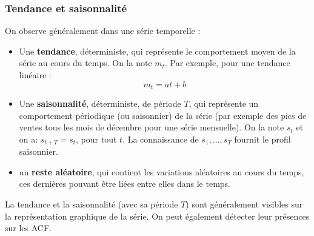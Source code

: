 \subsubsection{Tendance et saisonnalité}
On observe généralement dans une série temporelle :
\begin{itemize}
\item Une \textbf{tendance}, déterministe, qui représente le comportement moyen de la série au cours du temps. On la note $m_{t}$. Par exemple, pour une tendance linéaire : 
$$m_{t} = at + b$$
\item Une \textbf{saisonnalité}, déterministe, de période $T$, qui représente un comportement périodique (ou saisonnier) de la série (par exemple des pics de ventes tous les mois de décembre pour une série mensuelle). On la note $s_{t}$ et on a: $s_{t+T} = s_{t}$, pour tout $t$.\newline
La connaissance de $s_{1} ,\dots, s_{T}$ fournit le profil saisonnier.
\item un \textbf{reste aléatoire}, qui contient les variations aléatoires au cours du temps, ces dernières pouvant être liées entre elles dans le temps.
\end{itemize}
La tendance et la saisonnalité (avec sa période $T$) sont généralement visibles sur la représentation graphique de la série. On peut également détecter leur présences sur les ACF. \newline
\\
